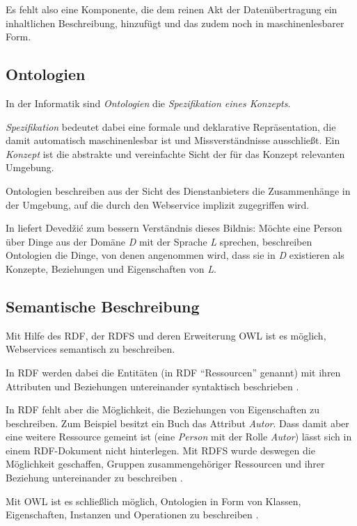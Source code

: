 Es fehlt also eine Komponente, die dem reinen Akt der Datenübertragung ein inhaltlichen Beschreibung, hinzufügt und das zudem noch in maschinenlesbarer Form.

\subsection{Ontologien}

In der Informatik sind \emph{Ontologien} die \emph{Spezifikation eines Konzepts}. 

\emph{Spezifikation} bedeutet dabei eine formale und deklarative Repräsentation, die damit automatisch maschinenlesbar ist und Missverständnisse ausschließt. Ein \emph{Konzept} ist die abstrakte und vereinfachte Sicht der für das Konzept relevanten Umgebung.

Ontologien beschreiben aus der Sicht des Dienstanbieters die Zusammenhänge in der Umgebung, auf die durch den Webservice implizit zugegriffen wird.

In \cite{dcswe} liefert Devedžić zum bessern Verständnis dieses Bildnis: Möchte eine Person über Dinge aus der Domäne \emph{D} mit der Sprache \emph{L} sprechen, beschreiben Ontologien die Dinge, von denen angenommen wird, dass sie in \emph{D} existieren als Konzepte, Beziehungen und Eigenschaften von \emph{L}.

\subsection{Semantische Beschreibung}

Mit Hilfe des \ac{RDF}, der \ac{RDFS} und deren Erweiterung \ac{OWL} ist es möglich, Webservices semantisch zu beschreiben. 

In \ac{RDF} werden dabei die Entitäten (in \ac{RDF} "`Ressourcen"' genannt) mit ihren Attributen und Beziehungen untereinander syntaktisch beschrieben \cite{w3c-rdf}.

In \ac{RDF} fehlt aber die Möglichkeit, die Beziehungen von Eigenschaften zu beschreiben. Zum Beispiel besitzt ein Buch das Attribut \emph{Autor}. Dass damit aber eine weitere Ressource gemeint ist (eine \emph{Person} mit der Rolle \emph{Autor}) lässt sich in einem \ac{RDF}-Dokument nicht hinterlegen. Mit \ac{RDFS} wurde deswegen die Möglichkeit geschaffen, Gruppen zusammengehöriger Ressourcen und ihrer Beziehung untereinander zu beschreiben \cite{w3c-rdfs}.

Mit \ac{OWL} ist es schließlich möglich, Ontologien in Form von Klassen, Eigenschaften, Instanzen und Operationen zu beschreiben \cite{w3c-owl2primer}.

